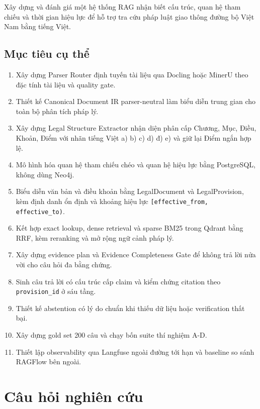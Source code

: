 \documentclass[a4paper,12pt]{extreport}
\newcommand{\code}[1]{\texttt{#1}}
\begin{document}
Xây dựng và đánh giá một hệ thống RAG nhận biết cấu trúc, quan hệ tham chiếu và thời gian hiệu lực để hỗ trợ tra cứu pháp luật giao thông đường bộ Việt Nam bằng tiếng Việt.

\subsection{Mục tiêu cụ thể}

\begin{enumerate}
  \item Xây dựng Parser Router định tuyến tài liệu qua Docling hoặc MinerU theo đặc tính tài liệu và quality gate.
  \item Thiết kế Canonical Document IR parser-neutral làm biểu diễn trung gian cho toàn bộ phân tích pháp lý.
  \item Xây dựng Legal Structure Extractor nhận diện phân cấp Chương, Mục, Điều, Khoản, Điểm với nhãn tiếng Việt a) b) c) d) đ) e) và giữ lại Điểm ngắn hợp lệ.
  \item Mô hình hóa quan hệ tham chiếu chéo và quan hệ hiệu lực bằng PostgreSQL, không dùng Neo4j.
  \item \begin{sloppypar} Biểu diễn văn bản và điều khoản bằng LegalDocument và LegalProvision, kèm định danh ổn định và khoảng hiệu lực \code{[effective\_from, effective\_to)}. \end{sloppypar}
  \item Kết hợp exact lookup, dense retrieval và sparse BM25 trong Qdrant bằng RRF, kèm reranking và mở rộng ngữ cảnh pháp lý.
  \item Xây dựng evidence plan và Evidence Completeness Gate để không trả lời nửa vời cho câu hỏi đa bằng chứng.
  \item Sinh câu trả lời có cấu trúc cấp claim và kiểm chứng citation theo \code{provision\_id} ở sáu tầng.
  \item Thiết kế abstention có lý do chuẩn khi thiếu dữ liệu hoặc verification thất bại.
  \item Xây dựng gold set 200 câu và chạy bốn suite thí nghiệm A-D.
  \item Thiết lập observability qua Langfuse ngoài đường tới hạn và baseline so sánh RAGFlow bên ngoài.
\end{enumerate}

\section{Câu hỏi nghiên cứu}
\end{document}
